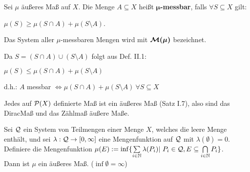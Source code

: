 \documentclass[11pt,a4paper,fleqn,openany]{report}
\begin{document}
    \begin{definition}
      Sei $\mu$ äußeres Maß auf $X$. Die Menge $A \subseteq X$ heißt \textbf{$\bm{\mu}$-messbar}, falls $\forall S \subseteq X$ gilt:
      \begin{center}
        $\mu(S) \geq \mu(S \cap A) + \mu(S \setminus A)$.
      \end{center}
      Das System aller $\mu$-messbaren Mengen wird mit $\bm{\mathcal{M}(\mu)}$ bezeichnet.
    \end{definition}

    \begin{remark}
      Da $S = (S \cap A) \cup (S \setminus A)$ folgt aus Def. II.1:
      \begin{center}
        $\mu(S) \leq \mu(S \cap A) + \mu(S \setminus A)$
      \end{center}
      d.h.: $A$ messbar $\Leftrightarrow \mu(S \cap A) + \mu(S \setminus A) \ \forall S \subseteq X$ 
    \end{remark}

    \begin{example}
      Jedes auf $\mathcal{P}(X)$ definierte Maß ist ein äußeres Maß (Satz I.7), also sind das DiracMaß und das Zählmaß äußere Maße.
    \end{example}

    \newpage
    \begin{theorem}
      Sei $\mathcal{Q}$ ein System von Teilmengen einer Menge $X$, welches die leere Menge enthält, und sei $\lambda: \mathcal{Q} \to [0,\infty]$ eine Mengenfunktion auf $\mathcal{Q}$ mit $\lambda(\emptyset)=0$. Definiere die Mengenfunktion $\mu(E):= \inf\{\sum\limits_{i \in \mathbb{N}} \lambda(P_i) |\ P_i \in \mathcal{Q}, E \subseteq \bigcap\limits_{i \in \mathbb{N}} P_i\}$.\\
      Dann ist $\mu$ ein äußeres Maß. \hfill ($\inf \emptyset = \infty$)
    \end{theorem}
\end{document}
